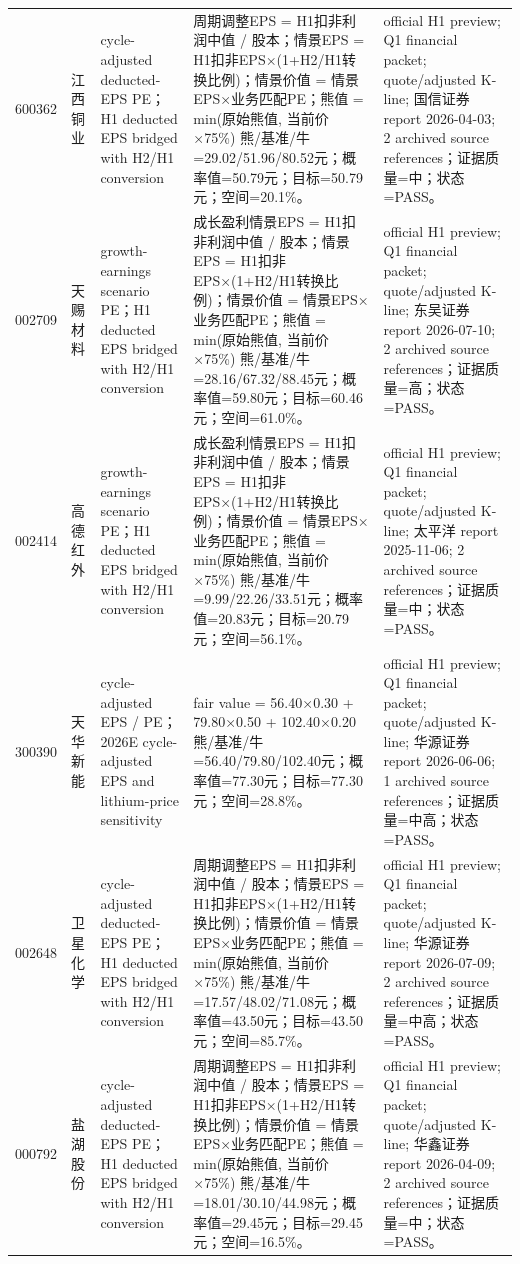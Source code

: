 \begin{longtable}{L{0.85cm}L{1.55cm}L{2.25cm}L{6.0cm}L{4.0cm}}
600362 & 江西铜业 & cycle-adjusted deducted-EPS PE；H1 deducted EPS bridged with H2/H1 conversion & 周期调整EPS = H1扣非利润中值 / 股本；情景EPS = H1扣非EPS×(1+H2/H1转换比例)；情景价值 = 情景EPS×业务匹配PE；熊值 = min(原始熊值, 当前价×75\%) 熊/基准/牛=29.02/51.96/80.52元；概率值=50.79元；目标=50.79元；空间=20.1\%。 & official H1 preview; Q1 financial packet; quote/adjusted K-line; 国信证券 report 2026-04-03; 2 archived source references；证据质量=中；状态=PASS。 \\
002709 & 天赐材料 & growth-earnings scenario PE；H1 deducted EPS bridged with H2/H1 conversion & 成长盈利情景EPS = H1扣非利润中值 / 股本；情景EPS = H1扣非EPS×(1+H2/H1转换比例)；情景价值 = 情景EPS×业务匹配PE；熊值 = min(原始熊值, 当前价×75\%) 熊/基准/牛=28.16/67.32/88.45元；概率值=59.80元；目标=60.46元；空间=61.0\%。 & official H1 preview; Q1 financial packet; quote/adjusted K-line; 东吴证券 report 2026-07-10; 2 archived source references；证据质量=高；状态=PASS。 \\
002414 & 高德红外 & growth-earnings scenario PE；H1 deducted EPS bridged with H2/H1 conversion & 成长盈利情景EPS = H1扣非利润中值 / 股本；情景EPS = H1扣非EPS×(1+H2/H1转换比例)；情景价值 = 情景EPS×业务匹配PE；熊值 = min(原始熊值, 当前价×75\%) 熊/基准/牛=9.99/22.26/33.51元；概率值=20.83元；目标=20.79元；空间=56.1\%。 & official H1 preview; Q1 financial packet; quote/adjusted K-line; 太平洋 report 2025-11-06; 2 archived source references；证据质量=中；状态=PASS。 \\
300390 & 天华新能 & cycle-adjusted EPS / PE；2026E cycle-adjusted EPS and lithium-price sensitivity & fair value = 56.40×0.30 + 79.80×0.50 + 102.40×0.20 熊/基准/牛=56.40/79.80/102.40元；概率值=77.30元；目标=77.30元；空间=28.8\%。 & official H1 preview; Q1 financial packet; quote/adjusted K-line; 华源证券 report 2026-06-06; 1 archived source references；证据质量=中高；状态=PASS。 \\
002648 & 卫星化学 & cycle-adjusted deducted-EPS PE；H1 deducted EPS bridged with H2/H1 conversion & 周期调整EPS = H1扣非利润中值 / 股本；情景EPS = H1扣非EPS×(1+H2/H1转换比例)；情景价值 = 情景EPS×业务匹配PE；熊值 = min(原始熊值, 当前价×75\%) 熊/基准/牛=17.57/48.02/71.08元；概率值=43.50元；目标=43.50元；空间=85.7\%。 & official H1 preview; Q1 financial packet; quote/adjusted K-line; 华源证券 report 2026-07-09; 2 archived source references；证据质量=中高；状态=PASS。 \\
000792 & 盐湖股份 & cycle-adjusted deducted-EPS PE；H1 deducted EPS bridged with H2/H1 conversion & 周期调整EPS = H1扣非利润中值 / 股本；情景EPS = H1扣非EPS×(1+H2/H1转换比例)；情景价值 = 情景EPS×业务匹配PE；熊值 = min(原始熊值, 当前价×75\%) 熊/基准/牛=18.01/30.10/44.98元；概率值=29.45元；目标=29.45元；空间=16.5\%。 & official H1 preview; Q1 financial packet; quote/adjusted K-line; 华鑫证券 report 2026-04-09; 2 archived source references；证据质量=中；状态=PASS。 \\

\end{longtable}
